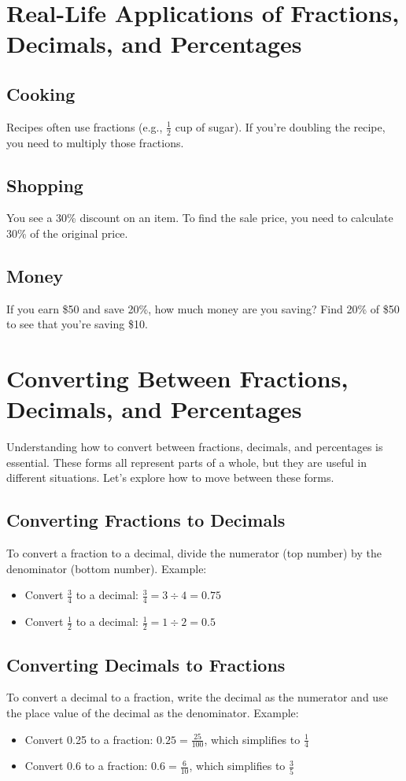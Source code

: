 \section{Real-Life Applications of Fractions, Decimals, and Percentages}
\subsection{Cooking}
Recipes often use fractions (e.g., $\frac{1}{2}$ cup of sugar). If you’re doubling the recipe, you need to multiply those fractions.

\subsection{Shopping}
You see a 30\% discount on an item. To find the sale price, you need to calculate 30\% of the original price.

\subsection{Money}
If you earn \$50 and save 20\%, how much money are you saving? Find 20\% of \$50 to see that you’re saving \$10.

\section{Converting Between Fractions, Decimals, and Percentages}
Understanding how to convert between fractions, decimals, and percentages is essential. These forms all represent parts of a whole, but they are useful in different situations. Let's explore how to move between these forms.

\subsection{Converting Fractions to Decimals}
To convert a fraction to a decimal, divide the numerator (top number) by the denominator (bottom number). Example:
\begin{itemize}
    \item Convert $\frac{3}{4}$ to a decimal: $\frac{3}{4} = 3 \div 4 = 0.75$
    \item Convert $\frac{1}{2}$ to a decimal: $\frac{1}{2} = 1 \div 2 = 0.5$
\end{itemize}

\subsection{Converting Decimals to Fractions}
To convert a decimal to a fraction, write the decimal as the numerator and use the place value of the decimal as the denominator. Example:
\begin{itemize}
    \item Convert 0.25 to a fraction: $0.25 = \frac{25}{100}$, which simplifies to $\frac{1}{4}$
    \item Convert 0.6 to a fraction: $0.6 = \frac{6}{10}$, which simplifies to $\frac{3}{5}$
\end{itemize}

